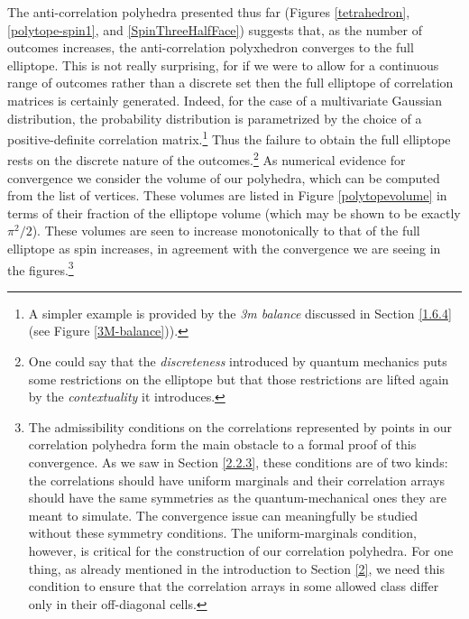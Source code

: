 The anti-correlation polyhedra presented thus far (Figures \ref{tetrahedron}, \ref{polytope-spin1}, and \ref{SpinThreeHalfFace}) suggests that, as the number of outcomes increases, the anti-correlation polyxhedron converges to the full elliptope. This is not really surprising, for if we were to allow for a continuous range of outcomes rather than a discrete set then the full elliptope of correlation matrices is certainly generated. Indeed, for the case of a multivariate Gaussian distribution, the probability distribution is parametrized by the choice of a positive-definite correlation matrix.\footnote{A simpler example is provided by the \emph{3m balance} discussed in Section \ref{1.6.4} (see Figure \ref{3M-balance})).\label{3M convergence}} Thus the failure to obtain the full elliptope rests on the discrete nature of the outcomes.\footnote{One could say that the \emph{discreteness} introduced by quantum mechanics puts some restrictions on the elliptope but that those restrictions are lifted again by the \emph{contextuality} it introduces.\label{discrete and contextual}}  As numerical evidence for convergence we consider the volume of our polyhedra, which can be computed from the list of vertices. These volumes are listed in Figure \ref{polytopevolume} in terms of their fraction of the elliptope volume (which may be shown to be exactly $\pi^2/2$). These volumes are seen to increase monotonically to that of the full elliptope as spin increases, in agreement with the convergence we are seeing in the figures.\footnote{The admissibility conditions on the correlations represented by points in our correlation polyhedra form the main obstacle to a formal proof of this convergence. As we saw in Section \ref{2.2.3}, these conditions are of two kinds: the correlations should have uniform marginals and their correlation arrays should have the same symmetries as the quantum-mechanical ones they are meant to simulate. The convergence issue can meaningfully be studied without these symmetry conditions. The uniform-marginals condition, however, is critical for the construction of our correlation polyhedra. For one thing, as already mentioned in the introduction to Section \ref{2}, we need this condition to ensure that the correlation arrays in some allowed class differ only in their off-diagonal cells.\label{no-convergence-proof}}


